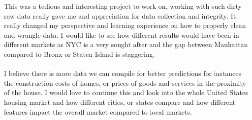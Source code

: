 \documentclass{article}
\begin{document}
\begin{titlepage}
This was a tedious and interesting project to work on, working with such dirty raw data really gave me and appreciation for data collection and integrity. It really changed my perspective and learning experience on how to properly clean and wrangle data. I would like to see how different results would have been in different markets as NYC is a very sought after and the gap between Manhattan compared to Bronx or Staten Island is staggering. 
\\
\\
I believe there is more data we can compile for better predictions for instances the construction costs of homes, or prices of goods and services in the proximity of the house. I would love to continue this and look into the whole United States housing market and how different cities, or states compare and how different features impact the overall market compared to local markets.  


\end{titlepage}
\end{document}
